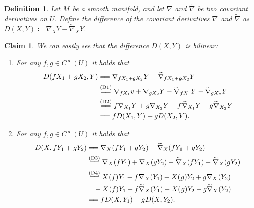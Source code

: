 \documentclass[11pt,a4paper,twoside,openany]{report}
\theoremstyle{my-theorem}
\newtheorem{claim}[theorem]{Claim}
\theoremstyle{non-theorem}
\newtheorem{definition}[theorem]{Definition}
\begin{document}
			\begin{definition}
				Let $M$ be a smooth manifold, and let $\nabla$ and $\tilde \nabla$ be two covariant derivatives on $U$. Define the \emph{difference} of the covariant derivatives $\nabla$ and $\tilde \nabla$ as $D(X,Y) \coloneqq \nabla_XY - \tilde\nabla_XY$.
			\end{definition}
		
			\begin{claim}
				\label{claim:difference-is-bilinear}
				We can easily see that the difference $D(X,Y)$ is bilinear:
				\begin{enumerate}[label=\rm(\alph*)]
					\item For any $f, g \in C^\infty(U)$ it holds that
					\begin{align*}
						D(fX_1+gX_2,Y) &=\joinrel= \nabla_{fX_1+gX_2}Y - \tilde\nabla_{fX_1+gX_2}Y
					\\
						&\overset{\text{(D1)}}{=\joinrel=} \nabla_{fX_1}v + \nabla_{gX_2}Y - \tilde\nabla_{fX_1}Y - \tilde\nabla_{gX_2}Y
					\\
						&\overset{\text{(D2)}}{=\joinrel=} f\nabla_{X_1}Y + g\nabla_{X_2}Y - f\tilde\nabla_{X_1}Y - g\tilde\nabla_{X_2}Y
					\\
						&=\joinrel= fD(X_1,Y) + gD(X_2,Y).
					\end{align*}
					\item For any $f, g \in C^\infty(U)$ it holds that
					\begin{align*}
						D(X,fY_1+gY_2) &=\joinrel= \nabla_X(fY_1+gY_2) - \tilde\nabla_X(fY_1+gY_2)
					\\
						&\overset{\text{(D3)}}{=\joinrel=} \nabla_X(fY_1) + \nabla_X(gY_2) - \tilde\nabla_X(fY_1) - \tilde\nabla_X(gY_2)
					\\
						&\overset{\text{(D4)}}{=\joinrel=} X(f)Y_1 + f\nabla_X(Y_1) + X(g)Y_2 + g\nabla_X(Y_2)
					\\
						&\quad - X(f)Y_1 - f\tilde\nabla_X(Y_1) - X(g)Y_2 - g\tilde\nabla_X(Y_2)
					\\
						&=\joinrel= fD(X,Y_1) + gD(X,Y_2).
					\end{align*}
				\end{enumerate}
			\end{claim}
		
\end{document}
